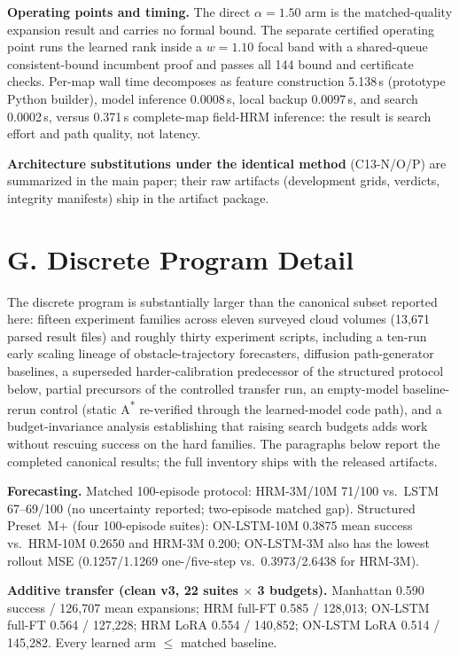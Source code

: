\documentclass[letterpaper]{article} %
\newcommand{\stage}[1]{\textsc{#1}}
\begin{document}
\textbf{Operating points and timing.} The direct $\alpha{=}1.50$ arm is the matched-quality expansion result and carries no formal bound. The separate certified operating point runs the learned rank inside a $w{=}1.10$ focal band with a shared-queue consistent-bound incumbent proof and passes all 144 bound and certificate checks. Per-map wall time decomposes as feature construction 5.138\,s (prototype Python builder), model inference 0.0008\,s, local backup 0.0097\,s, and search 0.0002\,s, versus 0.371\,s complete-map field-HRM inference: the result is search effort and path quality, not latency.

\textbf{Architecture substitutions under the identical method} (\stage{C13-N/O/P}) are summarized in the main paper; their raw artifacts (development grids, verdicts, integrity manifests) ship in the artifact package.

\section{G. Discrete Program Detail}

The discrete program is substantially larger than the canonical subset reported here: fifteen experiment families across eleven surveyed cloud volumes (13{,}671 parsed result files) and roughly thirty experiment scripts, including a ten-run early scaling lineage of obstacle-trajectory forecasters, diffusion path-generator baselines, a superseded harder-calibration predecessor of the structured protocol below, partial precursors of the controlled transfer run, an empty-model baseline-rerun control (static A\textsuperscript{*} re-verified through the learned-model code path), and a budget-invariance analysis establishing that raising search budgets adds work without rescuing success on the hard families. The paragraphs below report the completed canonical results; the full inventory ships with the released artifacts.

\textbf{Forecasting.} Matched 100-episode protocol: HRM-3M/10M 71/100 vs.\ LSTM 67--69/100 (no uncertainty reported; two-episode matched gap). Structured Preset~M+ (four 100-episode suites): ON-LSTM-10M 0.3875 mean success vs.\ HRM-10M 0.2650 and HRM-3M 0.200; ON-LSTM-3M also has the lowest rollout MSE (0.1257/1.1269 one-/five-step vs.\ 0.3973/2.6438 for HRM-3M).

\textbf{Additive transfer (clean v3, 22 suites $\times$ 3 budgets).} Manhattan 0.590 success / 126{,}707 mean expansions; HRM full-FT 0.585 / 128{,}013; ON-LSTM full-FT 0.564 / 127{,}228; HRM LoRA 0.554 / 140{,}852; ON-LSTM LoRA 0.514 / 145{,}282. Every learned arm $\leq$ matched baseline.
\end{document}

